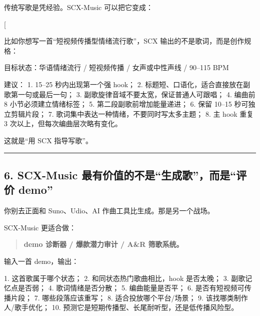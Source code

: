 \documentclass[
  12pt,
]{ctexart}
\newenvironment{Shaded}{}{}
\newcommand{\NormalTok}[1]{#1}
\begin{document}
传统写歌是凭经验。SCX-Music 可以把它变成：

{[}  \rightarrow {} \rightarrow
{} \rightarrow {} \rightarrow
{} \rightarrow \text{迭代修改}{]}

比如你想写一首``短视频传播型情绪流行歌''，SCX
输出的不是歌词，而是创作规格：

\begin{Shaded}
\begin{Highlighting}[]
\NormalTok{目标状态：华语情绪流行 / 短视频传播 / 女声或中性声线 / 90–115 BPM}

\NormalTok{建议：}
\NormalTok{1. 15–25 秒内出现第一个强 hook；}
\NormalTok{2. 标题短、口语化，适合直接放在副歌第一句或最后一句；}
\NormalTok{3. 副歌旋律音域不要太宽，保证普通人可跟唱；}
\NormalTok{4. 编曲前 8 小节必须建立情绪标签；}
\NormalTok{5. 第二段副歌前增加能量递进；}
\NormalTok{6. 保留 10–15 秒可独立剪辑片段；}
\NormalTok{7. 歌词集中表达一种情绪，不要同时写太多主题；}
\NormalTok{8. 主 hook 重复 3 次以上，但每次编曲层次略有变化。}
\end{Highlighting}
\end{Shaded}

这就是``用 SCX 指导写歌''。

\begin{center}\rule{0.5\linewidth}{0.5pt}\end{center}

\subsection{6. SCX-Music 最有价值的不是``生成歌''，而是``评价
demo''}\label{scx-music-ux6700ux6709ux4ef7ux503cux7684ux4e0dux662fux751fux6210ux6b4cux800cux662fux8bc4ux4ef7-demo}

你别去正面和 Suno、Udio、AI 作曲工具比生成。那是另一个战场。

SCX-Music 更适合做：

\begin{quote}
\textbf{demo 诊断器 / 爆款潜力审计 / A\&R 筛歌系统。}
\end{quote}

输入一首 demo，输出：

\begin{Shaded}
\begin{Highlighting}[]
\NormalTok{1. 这首歌属于哪个状态；}
\NormalTok{2. 和同状态热门歌曲相比，hook 是否太晚；}
\NormalTok{3. 副歌记忆点是否弱；}
\NormalTok{4. 歌词情绪是否分散；}
\NormalTok{5. 编曲能量是否平；}
\NormalTok{6. 是否有短视频可传播片段；}
\NormalTok{7. 哪些段落应该重写；}
\NormalTok{8. 适合投放哪个平台/场景；}
\NormalTok{9. 该找哪类制作人/歌手优化；}
\NormalTok{10. 预测它是短期传播型、长尾耐听型，还是低传播风险型。}
\end{Highlighting}
\end{Shaded}
\end{document}
